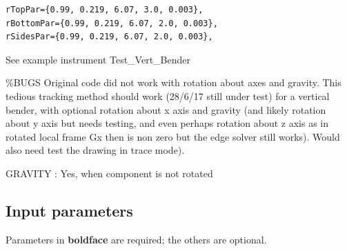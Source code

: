\begin{verbatim}
rTopPar={0.99, 0.219, 6.07, 3.0, 0.003},
rBottomPar={0.99, 0.219, 6.07, 2.0, 0.003},
rSidesPar={0.99, 0.219, 6.07, 2.0, 0.003},
\end{verbatim}

See example instrument Test\_Vert\_Bender

\%BUGS Original code did not work with rotation about axes and gravity. This tedious tracking method should work (28/6/17 still under test) for a vertical bender, with optional rotation about x axis and gravity (and likely rotation about y axis but needs testing, and even perhaps rotation about z axis as in rotated local frame Gx then is non zero but the edge solver still works). Would also need test the drawing in trace mode).

GRAVITY : Yes, when component is not rotated

\subsection*{Input parameters}
Parameters in \textbf{boldface} are required; the others are optional.

